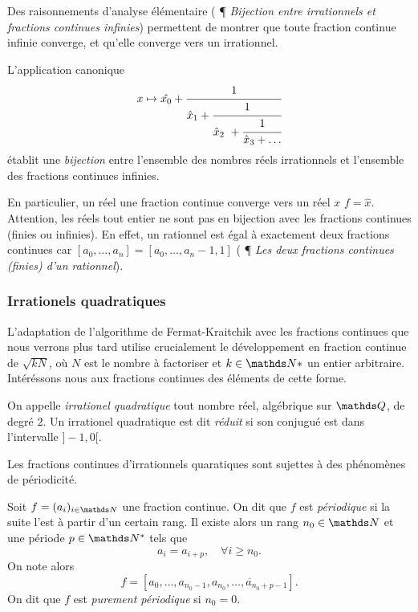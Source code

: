 Des raisonnements d'analyse élémentaire (\cite{wikiu} ¶ \emph{Bijection entre
irrationnels et fractions continues infinies}) permettent de montrer que toute
fraction continue infinie converge, et qu'elle converge vers un irrationnel.

\begin{theoreme}
	L'application canonique \[x \mapsto \hat{x_0} + \cfrac{1}{\hat{x}_1 +
	\cfrac{1}{\hat{x}_2 + \cfrac{1}{\hat{x}_3 + \dots}}}\] établit une
	\emph{bijection} entre l'ensemble des nombres réels irrationnels et
	l'ensemble des fractions continues infinies.
\end{theoreme}

En particulier, un réel une fraction continue converge vers un réel $x$ \ssi
$f=\hat{x}$. Attention, les réels tout entier ne sont pas en bijection avec les
fractions continues (finies ou infinies). En effet, un rationnel est égal à
exactement deux fractions continues car $[a_0, \dots, a_n] = [a_0, \dots, a_n -
1, 1]$ (\cite{wikiu} ¶ \emph{Les deux fractions continues (finies) d'un
rationnel}).

\subsubsection{Irrationels quadratiques}
\label{ss-irrquad}

L'adaptation de l'algorithme de Fermat-Kraitchik avec les fractions continues
que nous verrons plus tard utilise crucialement le développement en fraction
continue de $\sqrt{kN}$, où $N$ est le nombre à factoriser et $k\in \N*$ un
entier arbitraire. Intéréssons nous aux fractions continues des éléments de
cette forme.

\begin{definition}
	On appelle \emph{irrationel quadratique} tout nombre réel, algébrique sur
	$\Q$, de degré $2$. Un irrationel quadratique est dit \emph{réduit} si son
	conjugué est dans l'intervalle $]-1, 0[$.
\end{definition}

Les fractions continues d'irrationnels quaratiques sont sujettes à des
phénomènes de périodicité.

\begin{definition}
	Soit $f = (a_i)_{i\in \N}$ une fraction continue. On dit que $f$ est
	\emph{périodique} si la suite l'est à partir d'un certain rang. Il existe
	alors un rang $n_0\in \N$ et une période $p\in \N^*$ tels que \[a_{i} =
	a_{i+p}, \quad \forall i\geq n_0.\] On note alors \[f = [a_0, \dots, a_{n_0
	- 1}, \overline{a_{n_0}, \dots, a_{n_0 + p -1}}].\] On dit que $f$ est
	\emph{purement périodique} si $n_0 = 0$.
\end{definition}

